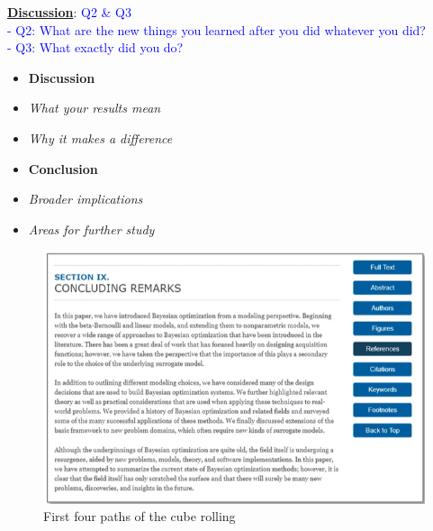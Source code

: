 \noindent\uline{\textbf{Discussion}}: 
\textcolor{blue}{Q2 \& Q3\\
- Q2: What are the new things you learned after you did whatever you did?\\
- Q3: What exactly did you do?}\\

\begin{itemize}
\color{red}
\item \textbf{Discussion}
\item \textit{What your results mean}
\item \textit{Why it makes a difference}
\item \textbf{Conclusion}
\item \textit{Broader implications}
\item \textit{Areas for further study}
\end{itemize}



\begin{figure}[h]
\centering
	\includegraphics[width=1\textwidth]{image/IEEEDisCon}
	\caption{First four paths of the cube rolling}
	\label{fig:Tetra2Case1}
\end{figure}

